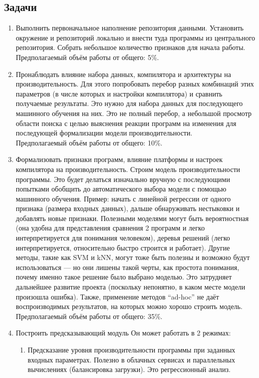 \subsection{Задачи}
\begin{enumerate}
\item {Выполнить первоначальное наполнение репозитория данными.
Установить окружение и репозиторий локально и внести туда программы из центрального репозитория.
Собрать небольшое количество признаков для начала работы.\\
Предполагаемый объём работы от общего: 5\%.}
\item {Пронаблюдать влияние набора данных, компилятора и архитектуры на производительность. 
Для этого попробовать перебор разных комбинаций этих параметров (в числе которых и настройки компилятора) и сравнить получаемые результаты. Это нужно для набора данных для последующего машинного обучения на них. 
Это не полный перебор, а небольшой просмотр области поиска с целью выяснения реакции программ на изменения для последующей формализации модели производительности.\\
Предполагаемый объём работы от общего: 10\%.}
\item {Формализовать признаки программ, влияние платформы и настроек компилятора на производительность.
Строим модель производительности программы. Это будет делаться изначально вручную с последующими попытками обобщить до автоматического выбора модели с помощью машинного обучения. Пример: начать с линейной регрессии от одного признака (размера входных данных), дальше обнаруживать нестыковки и добавлять новые признаки.
Полезными моделями могут быть вероятностная (она удобна для представления сравнения 2 программ и легко интерпретируется для понимания человеком), деревья решений (легко интерпретируется, относительно быстро строится и работает).
Другие методы, такие как SVM и kNN, могут тоже быть полезны и возможно будут использоваться — но они лишены такой черты, как простота понимания, почему именно такое решение было выбрано моделью. Это затрудняет дальнейшее развитие проекта (поскольку непонятно, в каком месте модели произошла ошибка). Также, применение методов “ad-hoc” не даёт воспроизводимых результатов, на которых можно хорошо строить модель.\\
Предполагаемый объём работы от общего: 35\%.}
\item {Построить предсказывающий модуль
Он может работать в 2 режимах:
	\begin{enumerate}
	\item Предсказание уровня производительности программы при заданных входных параметрах. Полезно в облачных сервисах и параллельных вычислениях (балансировка загрузки). Это регрессионный анализ.

\end{enumerate}}
\end{enumerate}
